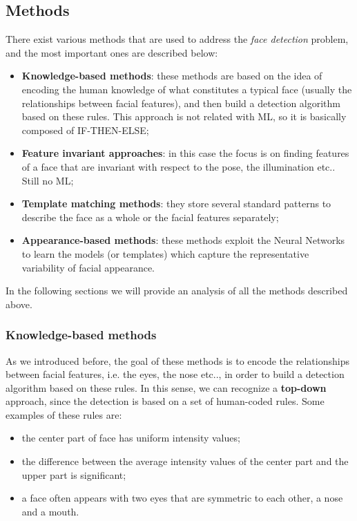 \subsection{Methods}
There exist various methods that are used to address the \textit{face detection} problem, and the most important ones are described below:

\begin{itemize}
    \item \textbf{Knowledge-based methods}: these methods are based on the idea of encoding the human knowledge of what constitutes a typical face (usually the relationships between facial features), and then build a detection algorithm based on these rules. This approach is not related with ML, so it is basically composed of IF-THEN-ELSE;
    \item \textbf{Feature invariant approaches}: in this case the focus is on finding features of a face that are invariant with respect to the pose, the illumination etc.. Still no ML;
    \item \textbf{Template matching methods}: they store several standard patterns to describe the face as a whole or the facial features separately;
    \item \textbf{Appearance-based methods}: these methods exploit the Neural Networks to learn the models (or templates) which capture the representative variability of facial appearance.
\end{itemize}

In the following sections we will provide an analysis of all the methods described above.

\subsubsection{Knowledge-based methods}
As we introduced before, the goal of these methods is to encode the relationships between facial features, i.e. the eyes, the nose etc.., in order to build a detection algorithm based on these rules. In this sense, we can recognize a \textbf{top-down} approach, since the detection is based on a set of human-coded rules. Some examples of these rules are:

\begin{itemize}
    \item the center part of face has uniform intensity values;
    \item the difference between the average intensity values of the center part and the upper part is significant;
    \item a face often appears with two eyes that are symmetric to each other, a nose and a mouth.
\end{itemize}

